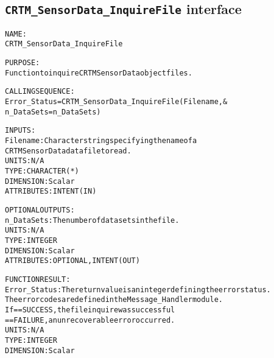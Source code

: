 \subsection{\texttt{CRTM\_SensorData\_InquireFile} interface}
  \label{sec:CRTM_SensorData_InquireFile_interface}
  \begin{alltt}
 
  NAME:
        CRTM_SensorData_InquireFile
 
  PURPOSE:
        Function to inquire CRTM SensorData object files.
 
  CALLING SEQUENCE:
        Error_Status = CRTM_SensorData_InquireFile( Filename           , &
                                                    n_DataSets = n_DataSets  )
 
  INPUTS:
        Filename:       Character string specifying the name of a
                        CRTM SensorData data file to read.
                        UNITS:      N/A
                        TYPE:       CHARACTER(*)
                        DIMENSION:  Scalar
                        ATTRIBUTES: INTENT(IN)
 
  OPTIONAL OUTPUTS:
        n_DataSets:     The number of datasets in the file.
                        UNITS:      N/A
                        TYPE:       INTEGER
                        DIMENSION:  Scalar
                        ATTRIBUTES: OPTIONAL, INTENT(OUT)
 
  FUNCTION RESULT:
        Error_Status:   The return value is an integer defining the error status.
                        The error codes are defined in the Message_Handler module.
                        If == SUCCESS, the file inquire was successful
                           == FAILURE, an unrecoverable error occurred.
                        UNITS:      N/A
                        TYPE:       INTEGER
                        DIMENSION:  Scalar
 
  \end{alltt}
